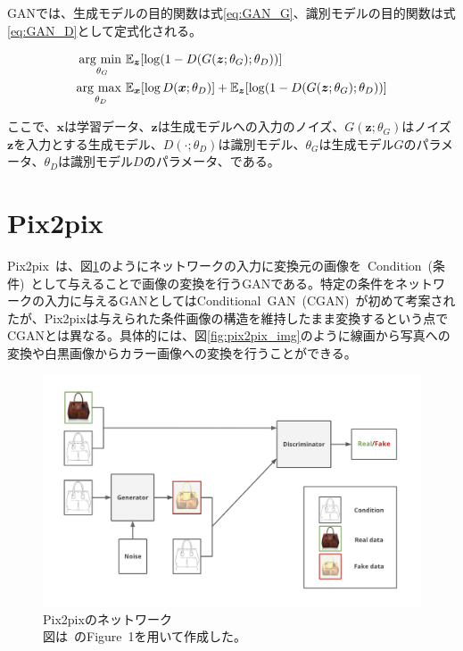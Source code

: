 GANでは、生成モデルの目的関数は式\ref{eq:GAN_G}、識別モデルの目的関数は式\ref{eq:GAN_D}として定式化される。

\begin{align}
    \label{eq:GAN_G}
    \mathop{\rm arg~min~}\limits _{\theta_G}& \mathbb{E}_{\boldsymbol{z}}[\log (1-D(G(\boldsymbol{z};\theta_G);\theta_D))]\\
    \label{eq:GAN_D}
    \mathop{\rm arg~max~}\limits _{\theta_D}& \mathbb{E}_{\boldsymbol{x}}[\log D(\boldsymbol{x};\theta_D)]+\mathbb{E}_{\boldsymbol{z}}[\log (1-D(G(\boldsymbol{z};\theta_G);\theta_D))]
\end{align}


ここで、$\boldsymbol{x}$は学習データ、$\boldsymbol{z}$は生成モデルへの入力のノイズ、$G(\boldsymbol{z};\theta_G)$はノイズ$\boldsymbol{z}$を入力とする生成モデル、$D(\cdot;\theta_D)$は識別モデル、$\theta_G$は生成モデル$G$のパラメータ、$\theta_D$は識別モデル$D$のパラメータ、である。

\section{Pix2pix}

Pix2pix~\cite{pix2pix}は、図\ref{fig:pix2pix_net}のようにネットワークの入力に変換元の画像を~Condition~(条件)~として与えることで画像の変換を行うGANである。特定の条件をネットワークの入力に与えるGANとしてはConditional~GAN~(CGAN)~\cite{CGAN}が初めて考案されたが、Pix2pixは与えられた条件画像の構造を維持したまま変換するという点でCGANとは異なる。具体的には、図\ref{fig:pix2pix_img}のように線画から写真への変換や白黒画像からカラー画像への変換を行うことができる。

\begin{figure}[b]
\begin{center}
\includegraphics[width=0.9\hsize]{figure/pix2pix_net.png}
\caption{Pix2pixのネットワーク\\
図は~\cite{pix2pix}のFigure~1を用いて作成した。}
\label{fig:pix2pix_net}
\end{center}
\end{figure}

